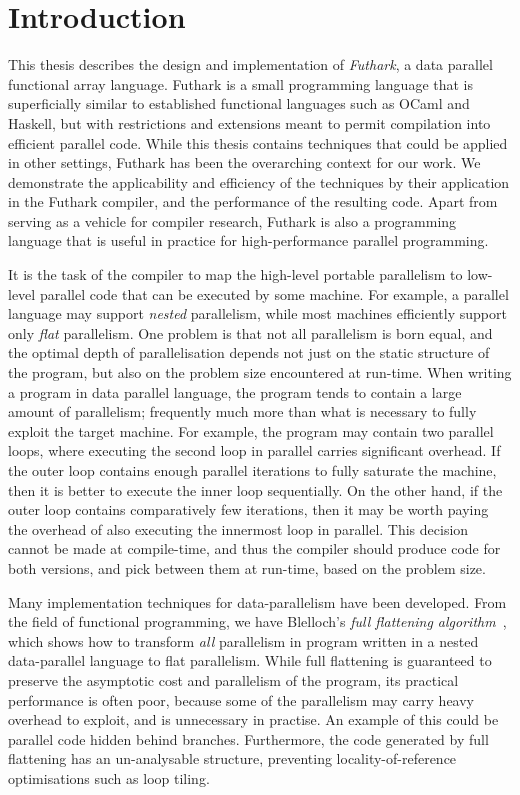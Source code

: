 \chapter{Introduction}

This thesis describes the design and implementation of
\textit{Futhark}, a data parallel functional array language.
Futhark is a small programming language that is superficially similar
to established functional languages such as OCaml and Haskell, but
with restrictions and extensions meant to permit compilation into
efficient parallel code.  While this thesis contains techniques that
could be applied in other settings, Futhark has been the overarching
context for our work.  We demonstrate the applicability and efficiency
of the techniques by their application in the Futhark compiler, and
the performance of the resulting code.  Apart from serving as a
vehicle for compiler research, Futhark is also a programming language
that is useful in practice for high-performance parallel programming.

It is the task of the compiler to map the high-level portable
parallelism to low-level parallel code that can be executed by some
machine.  For example, a parallel language may support \textit{nested}
parallelism, while most machines efficiently support only
\textit{flat} parallelism.  One problem is that not all parallelism is
born equal, and the optimal depth of parallelisation depends not just
on the static structure of the program, but also on the problem size
encountered at run-time.  When writing a program in data parallel
language, the program tends to contain a large amount of parallelism;
frequently much more than what is necessary to fully exploit the
target machine.  For example, the program may contain two parallel
loops, where executing the second loop in parallel carries significant
overhead.  If the outer loop contains enough parallel iterations to
fully saturate the machine, then it is better to execute the inner
loop sequentially.  On the other hand, if the outer loop contains
comparatively few iterations, then it may be worth paying the overhead
of also executing the innermost loop in parallel.  This decision
cannot be made at compile-time, and thus the compiler should produce
code for both versions, and pick between them at run-time, based on
the problem size.

Many implementation techniques for data-parallelism have been
developed.  From the field of functional programming, we have
Blelloch's \textit{full flattening
  algorithm}~\cite{blelloch1994implementation}, which shows how to
transform \textit{all} parallelism in program written in a nested
data-parallel language to flat parallelism.  While full flattening is
guaranteed to preserve the asymptotic cost and parallelism of the
program, its practical performance is often poor, because some of the
parallelism may carry heavy overhead to exploit, and is unnecessary in
practise.  An example of this could be parallel code hidden behind
branches.  Furthermore, the code generated by full flattening has an
un-analysable structure, preventing locality-of-reference
optimisations such as loop tiling.


